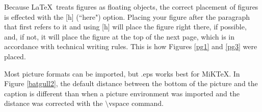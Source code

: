 Because \LaTeX \ treats figures as floating objects,
the correct placement of figures is effected with the
[h] (``here") option.
Placing your figure after the paragraph that first refers to it
and using [h] will place the figure right there, if possible, and,
if not, it will place the figure at the top of the next page,
which is in accordance with technical writing rules.
This is how Figures \ref{pg1} and \ref{pg3} were placed.

%
%
%
%
%
%







Most picture formats can be imported, but
.eps works best for MiK\TeX.
In Figure \ref{batgull2},
the default distance between the
bottom of the picture and the
caption is different than when a
picture environment was imported
and the distance was corrected with the $\setminus $vspace
command.



